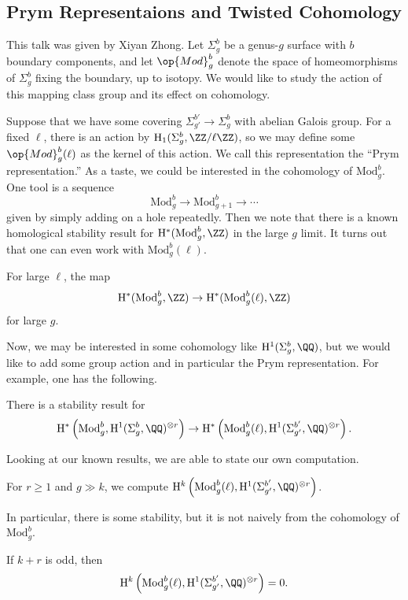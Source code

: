 \documentclass{article}
\begin{document}
\subsection{Prym Representaions and Twisted Cohomology}
This talk was given by Xiyan Zhong. Let $\Sigma_g^b$ be a genus-$g$ surface with $b$ boundary components, and let $\op{Mod}_g^b$ denote the space of homeomorphisms of $\Sigma_g^b$ fixing the boundary, up to isotopy. We would like to study the action of this mapping class group and its effect on cohomology.

Suppose that we have some covering $\Sigma^{b'}_{g'}\to\Sigma_g^b$ with abelian Galois group. For a fixed $\ell$, there is an action by $\mathrm H_1(\Sigma_g^b,\ZZ/\ell\ZZ)$, so we may define some $\op{Mod}_g^b(\ell)$ as the kernel of this action. We call this representation the ``Prym representation.'' %
As a taste, we could be interested in the cohomology of $\mathrm{Mod}_g^b$. One tool is a sequence
\[\mathrm{Mod}_g^b\to\mathrm{Mod}_{g+1}^b\to\cdots\]
given by simply adding on a hole repeatedly. Then we note that there is a known homological stability result for $\mathrm H^*(\mathrm{Mod}_g^b,\ZZ)$ in the large $g$ limit. It turns out that one can even work with $\mathrm{Mod}_g^b(\ell)$.
\begin{theorem}[Putnam]
	For large $\ell$, the map
	\[\mathrm H^*(\mathrm{Mod}_g^b,\ZZ)\to\mathrm H^*(\mathrm{Mod}_g^b(\ell),\ZZ)\]
	for large $g$.
\end{theorem}
Now, we may be interested in some cohomology like $\mathrm H^1(\Sigma_g^b,\QQ)$, but we would like to add some group action and in particular the Prym representation. For example, one has the following.
\begin{theorem}[Putnam]
	There is a stability result for
	\[\mathrm H^*\left(\mathrm{Mod}_g^b,\mathrm H^1(\Sigma_g^b,\QQ)^{\otimes r}\right)\to\mathrm H^*\left(\mathrm{Mod}_g^b(\ell),\mathrm H^1(\Sigma_{g'}^{b'},\QQ)^{\otimes r}\right).\]
\end{theorem}
Looking at our known results, we are able to state our own computation.
\begin{theorem}
	For $r\ge1$ and $g\gg k$, we compute $\mathrm H^k\left(\mathrm{Mod}_g^b(\ell),\mathrm H^1(\Sigma_{g'}^{b'},\QQ)^{\otimes r}\right)$.
\end{theorem}
In particular, there is some stability, but it is not naively from the cohomology of $\mathrm{Mod}_g^b$.
\begin{example}
	If $k+r$ is odd, then
	\[\mathrm H^k\left(\mathrm{Mod}_g^b(\ell),\mathrm H^1(\Sigma_{g'}^{b'},\QQ)^{\otimes r}\right)=0.\]
\end{example}
\end{document}
